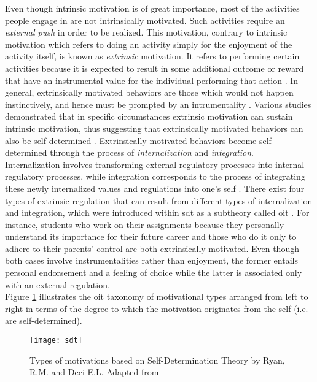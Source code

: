 Even though intrinsic motivation is of great importance, most of the activities people engage in are not intrinsically motivated. Such activities require an \textit{external push} in order to be realized. This motivation, contrary to intrinsic motivation which refers to doing an activity simply for the enjoyment of the activity itself, is known as \textit{extrinsic} motivation. It refers to performing certain activities because it is expected to result in some additional outcome or reward that have an instrumental value for the individual performing that action \cite{ryan2000self}. In general, extrinsically motivated behaviors are those which would not happen instinctively, and hence must be prompted by an intrumentality \cite{deci1994promoting}. Various studies demonstrated that in specific circumstances extrinsic motivation can sustain intrinsic motivation, thus suggesting that extrinsically motivated behaviors can also be self-determined \cite{deci1994promoting}. Extrinsically motivated behaviors become self-determined through the process of \textit{internalization} and \textit{integration}.\\ Internalization involves transforming external regulatory processes into internal regulatory processes, while integration corresponds to the process of integrating these newly internalized values and regulations into one's self \cite{deci1994promoting}. There exist four types of extrinsic regulation that can result from different types of internalization and integration, which were introduced within \acrshort{sdt} as a subtheory called \acrfull{oit} \cite{deci1994promoting, ryan2000intrinsic, ryan2000self}. For instance, students who work on their assignments because they personally understand its importance for their future career and those who do it only to adhere to their parents' control are both extrinsically motivated. Even though both cases involve instrumentalities rather than enjoyment, the former entails personal endorsement and a feeling of choice while the latter is associated only with an external regulation.\\
Figure \ref{fig:tax} illustrates the \acrshort{oit} taxonomy of motivational types arranged from left to right in terms of the degree to which the motivation originates from the self (i.e. are self-determined).\\ 
\begin{figure}[h]
    \centering
    \texttt{[image: sdt]}
    \caption{Types of motivations based on Self-Determination  Theory by Ryan, R.M. and Deci E.L. Adapted from  \cite{ryan2000intrinsic}}
    \label{fig:tax}
\end{figure}\\
